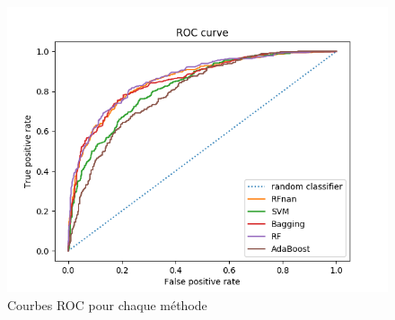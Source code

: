 \documentclass[12pt]{article}
\begin{document}
\begin{figure}[H]
    \center
    \includegraphics[width=\textwidth]{images/ROC_curves.png}
    \caption{Courbes ROC pour chaque méthode}
    \label{img:roc-curves}
\end{figure}



\newpage
\printbibliography
\end{document}
